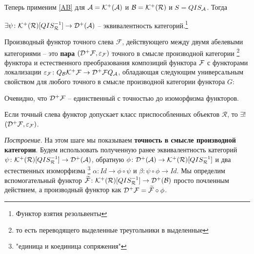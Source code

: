 \documentclass[../main.tex]{subfiles}
\begin{document}
Теперь применим \ref{AB} для $\mathcal{A} = \mathcal{K^+(\mathcal{A})}$ и $\mathcal{B} = \mathcal{K^+(\mathcal{R})}$ и $S = QIS_{\mathcal{A}}$. Тогда 
\begin{to_claim}
$\exists \psi\colon \mathcal{K^+(\mathcal{R})}[QIS_{\mathcal{R}}^{-1}]\to \mathcal{D^+(\mathcal{A})}$ -- эквивалентность категорий.\footnote{Функтор взятия резольвенты}
\end{to_claim}
\begin{to_def}
\label{derived_functor}
Производный функтор точного слева $\mathcal{F}$, действующего между двумя абелевыми категориями -- это \textbf{пара} $(\mathcal{D^+ F}, \varepsilon_{\mathcal{F}})$ точного в смысле производной категории \footnote{то есть переводящего выделенные треугольники в выделенные} функтора и естественного преобразования композиций функтора $\mathcal{F}$ с функторами локализации $\varepsilon_{\mathcal{F}}\colon Q_{\mathcal{B}}\mathcal{K^+ F} \to \mathcal{D^+ F} Q_{\mathcal{A}}$, обладающая следующим универсальным свойством для любого точного в смысле производной категории функтора $G$:
\bee
{}
\eee
\bee
{}
\eee
\end{to_def}
\begin{to_com}
Очевидно, что $\mathcal{D^+ \mathcal{F}}$ -- единственный с точностью до изоморфизма функторов.
\end{to_com}
\begin{to_thr}
Если точный слева функтор допускает класс приспособленных объектов $\mathcal{R}$, то $\exists !$ $(\mathcal{D^+ \mathcal{F}}, \varepsilon_{\mathcal{F}})$.
\end{to_thr}
\textit{Построение}. На этом шаге мы показываем \textbf{точность в смысле производной категории}.
     Будем использовать полученную ранее эквивалентность категорий $\psi\colon \mathcal{K^+(\mathcal{R})}[QIS_{\mathcal{R}}^{-1}]\to \mathcal{D^+(\mathcal{A})}$, обратную $\phi \colon \mathcal{D^+(\mathcal{A})} \to \mathcal{K^+(\mathcal{R})}[QIS_{\mathcal{R}}^{-1}]$ и два естественных изоморфизма \footnote{"единица и коединица сопряжения"} $\alpha\colon Id \to \phi \circ \psi$ и $\beta \colon \psi \circ \phi \to Id$. Мы определим вспомогательный функтор  $\widetilde{\mathcal{F}}\colon \mathcal{K^+(\mathcal{R})}[QIS_{\mathcal{R}}^{-1}]\to \mathcal{D^+(\mathcal{B})}$ просто почленным действием, а производный функтор как $\mathcal{D^+ \mathcal{F}} = \widetilde{\mathcal{F}} \circ \phi$.
\end{document}
